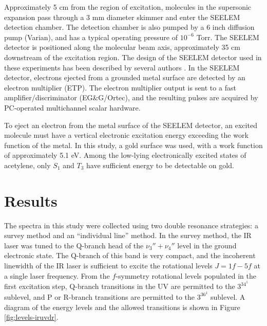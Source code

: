 \documentclass[12pt]{mitthesis}
\begin{document}
Approximately 5 cm from the region of excitation, molecules in the
supersonic expansion pass through a 3 mm diameter skimmer and enter
the SEELEM detection chamber.  The detection chamber is also pumped by
a 6 inch diffusion pump (Varian), and has a typical operating pressure
of $10^{-6}$ Torr.  The SEELEM detector is positioned along the
molecular beam axis, approximately 35 cm downstream of the excitation
region.  The design of the SEELEM detector used in these experiments
has been described by several authors \cite{cunningham-thesis,
  altunata-thesis}.  In the SEELEM detector, electrons
ejected from a grounded metal surface are detected by an electron
multiplier (ETP).  The electron multiplier output is sent to a fast
amplifier/discriminator (EG\&G/Ortec), and the resulting pulses are
acquired by PC-operated multichannel scalar hardware.

To eject an electron from the metal surface of the SEELEM detector, an
excited molecule must have a vertical electronic excitation energy
exceeding the work function of the metal.  In this study, a gold
surface was used, with a work function of approximately 5.1 eV.
Among the low-lying electronically excited states of acetylene, only
$S_1$ and $T_3$ have sufficient energy to be detectable on gold.





















\section{Results}

The spectra in this study were collected using two double resonance
strategies: a survey method and an ``individual line'' method.  In the
survey method, the IR laser was tuned to the Q-branch head of the
$\nu_3''+\nu_4''$ level in the ground electronic state.  The Q-branch of
this band is very compact, and the incoherent linewidth of the IR
laser is sufficient to excite the rotational levels $J=1f-5f$ at a
single laser frequency.  From the $f$-symmetry rotational levels
populated in the first excitation step, Q-branch transitions in the UV
are permitted to the $3^34^1$  sublevel, and P or R-branch
transitions are permitted to the $3^36^1$  sublevel.  A diagram
of the energy levels and the allowed transitions is shown in Figure
\ref{fig:levels-iruvdr}.
\end{document}
